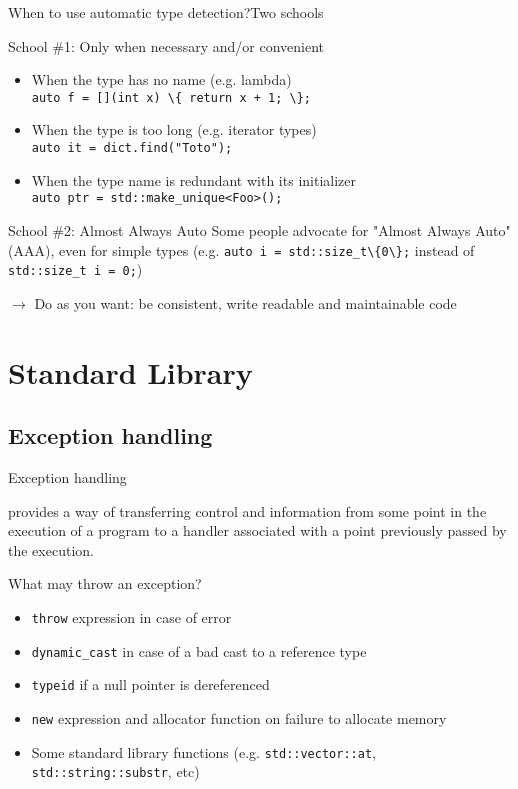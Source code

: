 \begin{frame}{When to use automatic type detection?}{Two schools}
  \begin{block}{School \#1: Only when necessary and/or convenient}
    \begin{itemize}
    \item
      When the type has no name (e.g. lambda) \\
      \lstinline!auto f = [](int x) \{ return x + 1; \};!
    \item
      When the type is too long (e.g. iterator types) \\
      \lstinline!auto it = dict.find("Toto");!
    \item
      When the type name is redundant with its initializer \\
      \lstinline!auto ptr = std::make_unique<Foo>();!
    \end{itemize}
  \end{block}
  \begin{block}{School \#2: Almost Always Auto}
    Some people advocate for "Almost Always Auto" (AAA), even for simple types
    (e.g. \lstinline!auto i = std::size_t\{0\};! instead of \lstinline!std::size_t i = 0;!)
  \end{block}
  $\to$ Do as you want: be consistent, write readable and maintainable code
\end{frame}

\section{Standard Library}

\subsection{Exception handling}

\begin{frame}{Exception handling}{}
  \begin{definition}
     provides a way of transferring control and information from some point in the execution of a program to a handler associated with a point previously passed by the execution.
  \end{definition}

  \begin{block}{What may throw an exception?}
    \begin{itemize}
    \item
      \lstinline!throw! expression in case of error
    \item
      \lstinline!dynamic_cast! in case of a bad cast to a reference type
    \item
      \lstinline!typeid! if a null pointer is dereferenced
    \item
      \lstinline!new! expression and allocator function on failure to allocate memory
    \item
      Some standard library functions (e.g. \lstinline!std::vector::at!, \lstinline!std::string::substr!, etc)
    \end{itemize}
  \end{block}
\end{frame}

